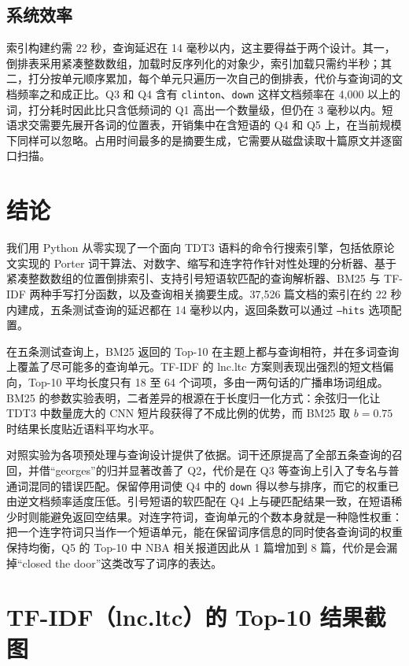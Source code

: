 \documentclass[12pt,a4paper]{ctexart}
\begin{document}
\subsection{系统效率}

索引构建约需 22 秒，查询延迟在 14 毫秒以内，这主要得益于两个设计。其一，倒排表采用紧凑整数数组，加载时反序列化的对象少，索引加载只需约半秒；其二，打分按单元顺序累加，每个单元只遍历一次自己的倒排表，代价与查询词的文档频率之和成正比。Q3 和 Q4 含有 \texttt{clinton}、\texttt{down} 这样文档频率在 4,000 以上的词，打分耗时因此比只含低频词的 Q1 高出一个数量级，但仍在 3 毫秒以内。短语求交需要先展开各词的位置表，开销集中在含短语的 Q4 和 Q5 上，在当前规模下同样可以忽略。占用时间最多的是摘要生成，它需要从磁盘读取十篇原文并逐窗口扫描。

\section{结论}

我们用 Python 从零实现了一个面向 TDT3 语料的命令行搜索引擎，包括依原论文实现的 Porter 词干算法、对数字、缩写和连字符作针对性处理的分析器、基于紧凑整数数组的位置倒排索引、支持引号短语软匹配的查询解析器、BM25 与 TF-IDF 两种手写打分函数，以及查询相关摘要生成。37,526 篇文档的索引在约 22 秒内建成，五条测试查询的延迟都在 14 毫秒以内，返回条数可以通过 \texttt{--hits} 选项配置。

在五条测试查询上，BM25 返回的 Top-10 在主题上都与查询相符，并在多词查询上覆盖了尽可能多的查询单元。TF-IDF 的 lnc.ltc 方案则表现出强烈的短文档偏向，Top-10 平均长度只有 18 至 64 个词项，多由一两句话的广播串场词组成。BM25 的参数实验表明，二者差异的根源在于长度归一化方式：余弦归一化让 TDT3 中数量庞大的 CNN 短片段获得了不成比例的优势，而 BM25 取 $b = 0.75$ 时结果长度贴近语料平均水平。

对照实验为各项预处理与查询设计提供了依据。词干还原提高了全部五条查询的召回，并借“georges”的归并显著改善了 Q2，代价是在 Q3 等查询上引入了专名与普通词混同的错误匹配。保留停用词使 Q4 中的 \texttt{down} 得以参与排序，而它的权重已由逆文档频率适度压低。引号短语的软匹配在 Q4 上与硬匹配结果一致，在短语稀少时则能避免返回空结果。对连字符词，查询单元的个数本身就是一种隐性权重：把一个连字符词只当作一个短语单元，能在保留词序信息的同时使各查询词的权重保持均衡，Q5 的 Top-10 中 NBA 相关报道因此从 1 篇增加到 8 篇，代价是会漏掉“closed the door”这类改写了词序的表达。

\appendix

\section{TF-IDF（lnc.ltc）的 Top-10 结果截图}
\label{app:tfidf}
\end{document}
